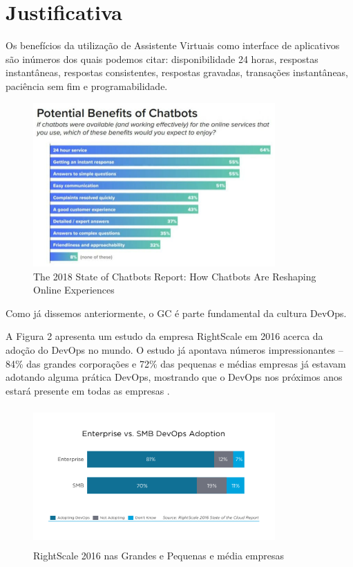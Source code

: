 \documentclass[quali]{mpit}
\begin{document}
\section{Justificativa}

Os benefícios da utilização de Assistente Virtuais como interface de aplicativos são inúmeros dos quais podemos citar: disponibilidade 24 horas,  respostas instantâneas, respostas consistentes, respostas gravadas, transações instantâneas, paciência sem fim e programabilidade. 

\begin{figure}[H]
\centering
\includegraphics [width=350px]{chatbot-potential-benefits-1024x473}
\caption{The 2018 State of Chatbots Report: How Chatbots Are Reshaping Online Experiences}
\end{figure}

Como já dissemos anteriormente, o  GC é parte fundamental da cultura DevOps. 

A Figura 2 apresenta um estudo da empresa RightScale em 2016 acerca da adoção do  DevOps no mundo. O estudo já apontava números impressionantes – 84\% das grandes corporações e 72\% das pequenas e médias empresas já estavam adotando 
alguma prática DevOps, mostrando que o DevOps nos próximos anos estará presente em todas as empresas .

\begin{figure}[H]
\centering
\includegraphics [width=350px,height=200px]{devops-adoption}
\caption{RightScale 2016 nas Grandes e Pequenas e média empresas}
\end{figure}
\end{document}
